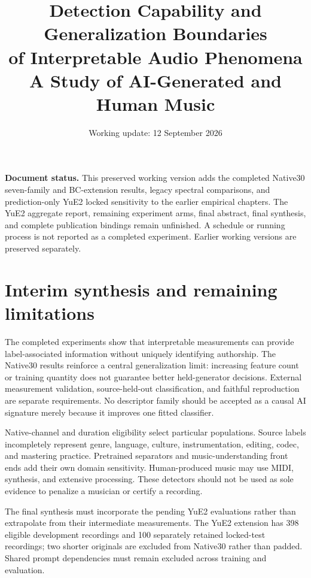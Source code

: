 \documentclass[11pt,a4paper]{article}
\title{Detection Capability and Generalization Boundaries\\of Interpretable Audio Phenomena\\
\large A Study of AI-Generated and Human Music}
\author{}
\date{Working update: 12 September 2026}
\begin{document}
\maketitle
\noindent\textbf{Document status.} This preserved working version adds the completed
Native30 seven-family and BC-extension results, legacy spectral comparisons,
and prediction-only YuE2 locked sensitivity to the earlier empirical chapters.
The YuE2 aggregate report, remaining
experiment arms, final abstract, final synthesis, and complete publication bindings
remain unfinished. A schedule or running process is not reported as a completed
experiment. Earlier working versions are preserved separately.
\tableofcontents
\clearpage













\section{Interim synthesis and remaining limitations}
The completed experiments show that interpretable measurements can provide
label-associated information without uniquely identifying authorship. The
Native30 results reinforce a central generalization limit: increasing feature
count or training quantity does not guarantee better held-generator decisions.
External measurement validation, source-held-out classification, and faithful
reproduction are separate requirements. No descriptor family should be accepted
as a causal AI signature merely because it improves one fitted classifier.

Native-channel and duration eligibility select particular populations. Source
labels incompletely represent genre, language, culture, instrumentation, editing,
codec, and mastering practice. Pretrained separators and music-understanding
front ends add their own domain sensitivity. Human-produced music may use MIDI,
synthesis, and extensive processing. These detectors should not be used as sole
evidence to penalize a musician or certify a recording.

The final synthesis must incorporate the pending YuE2 evaluations rather
than extrapolate from their intermediate measurements. The YuE2 extension has
398 eligible development recordings and 100 separately retained locked-test
recordings; two shorter originals are excluded from Native30 rather than padded.
Shared prompt dependencies must remain excluded across training and evaluation.



\end{document}
